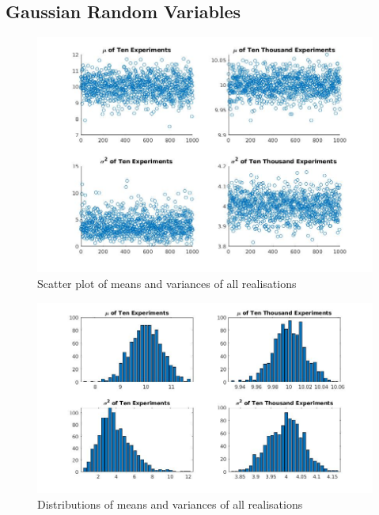 \documentclass[a4paper, 12pt]{article}
\begin{document}
        \subsection{Gaussian Random Variables}
            \begin{figure}[!ht]
                \centering
                \includegraphics[width=\textwidth]{scatterPlots.jpg}
                \caption{Scatter plot of means and variances of all realisations}
                \label{fig:scatters}
            \end{figure}

            \begin{figure}[!ht]
                \centering
                \includegraphics[width=\textwidth]{pdfOfMeansAndStdDev.jpg}
                \caption{Distributions of means and variances of all realisations}
                \label{fig:dists}
            \end{figure}
\end{document}
